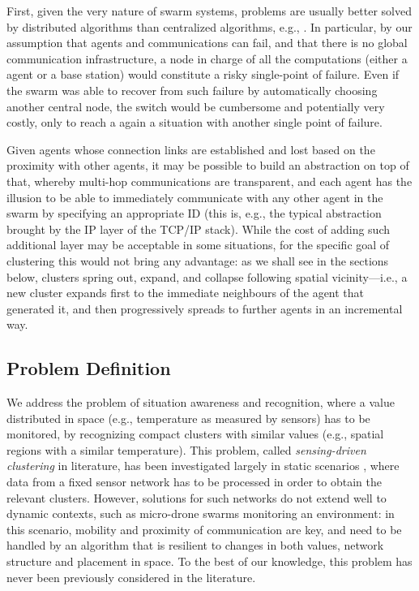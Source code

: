{First, given the very nature of swarm systems, problems are usually better solved by distributed algorithms than centralized algorithms, e.g., \cite{hoshino:2013,DBLP:journals/asc/CruzNM17}. In particular, by our assumption that agents and communications can fail, and that there is no global communication infrastructure, a node in charge of all the computations (either a agent or a base station) would constitute a risky single-point of failure. Even if the swarm was able to recover from such failure by automatically choosing another central node, the switch would be cumbersome and potentially very costly, only to reach a again a situation with another single point of failure.

Given agents whose connection links are established and lost based on the proximity with other agents, it may be possible to build an abstraction on top of that, whereby multi-hop communications are transparent, and each agent has the illusion to be able to immediately communicate with any other agent in the swarm by specifying an appropriate ID (this is, e.g., the typical abstraction brought by the IP layer of the TCP/IP stack). While the cost of adding such additional layer may be acceptable in some situations, for the specific goal of clustering this would not bring any advantage: as we shall see in the sections below, clusters spring out, expand, and collapse following spatial vicinity---i.e., a new cluster expands first to the immediate neighbours of the agent that generated it, and then progressively spreads to further agents in an incremental way.
}

\subsection{Problem Definition}\label{ssec:problem-def}

We address the problem of situation awareness and recognition, where a value distributed in space (e.g., temperature as measured by sensors) has to be monitored,
 by recognizing compact clusters with similar values (e.g., spatial regions with a similar temperature).
 This problem, called \emph{sensing-driven clustering} in literature, has been investigated largely in static scenarios \cite{DBLP:journals/jaihc/KucukBSK20,DBLP:journals/ijcomsys/PhamLPC10,DBLP:conf/ccnc/LinM07},
 where data from a fixed sensor network has to be processed in order to obtain the relevant clusters.
 However, solutions for such networks do not extend well to dynamic contexts, such as micro-drone swarms monitoring an environment:
 in this scenario, mobility and proximity of communication are key,
 and need to be handled by an algorithm that is resilient to changes in both values, network structure and placement in space.
 To the best of our knowledge, this problem has never been previously considered in the literature.

